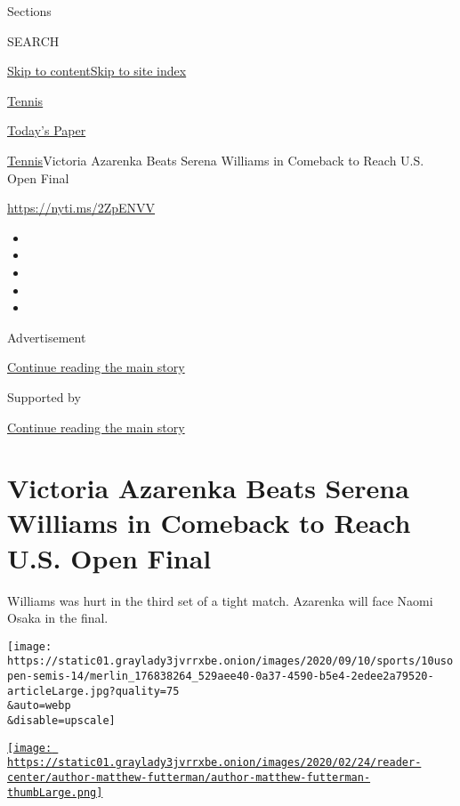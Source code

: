 Sections

SEARCH

\protect\hyperlink{site-content}{Skip to
content}\protect\hyperlink{site-index}{Skip to site index}

\href{https://www.nytimes3xbfgragh.onion/section/sports/tennis}{Tennis}

\href{https://myaccount.nytimes3xbfgragh.onion/auth/login?response_type=cookie\&client_id=vi}{}

\href{https://www.nytimes3xbfgragh.onion/section/todayspaper}{Today's
Paper}

\href{/section/sports/tennis}{Tennis}\textbar{}Victoria Azarenka Beats
Serena Williams in Comeback to Reach U.S. Open Final

\url{https://nyti.ms/2ZpENVV}

\begin{itemize}
\item
\item
\item
\item
\item
\end{itemize}

Advertisement

\protect\hyperlink{after-top}{Continue reading the main story}

Supported by

\protect\hyperlink{after-sponsor}{Continue reading the main story}

\hypertarget{victoria-azarenka-beats-serena-williams-in-comeback-to-reach-us-open-final}{%
\section{Victoria Azarenka Beats Serena Williams in Comeback to Reach
U.S. Open
Final}\label{victoria-azarenka-beats-serena-williams-in-comeback-to-reach-us-open-final}}

Williams was hurt in the third set of a tight match. Azarenka will face
Naomi Osaka in the final.

\texttt{[image: https://static01.graylady3jvrrxbe.onion/images/2020/09/10/sports/10usopen-semis-14/merlin\_176838264\_529aee40-0a37-4590-b5e4-2edee2a79520-articleLarge.jpg?quality=75\\\&auto=webp\\\&disable=upscale]}

\href{https://www.nytimes3xbfgragh.onion/by/matthew-futterman}{\texttt{[image: https://static01.graylady3jvrrxbe.onion/images/2020/02/24/reader-center/author-matthew-futterman/author-matthew-futterman-thumbLarge.png]}}

